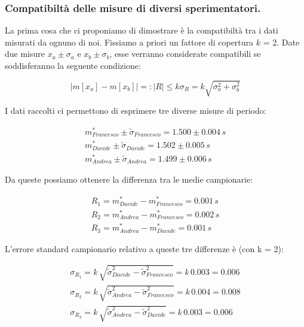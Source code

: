 \subsubsection{Compatibiltà delle misure di diversi sperimentatori.}

La prima cosa che ci proponiamo di dimostrare è la compatibiltà
tra i dati misurati da ognuno di noi. Fissiamo a priori un fattore
di copertura $k$ = 2. Date due misure $x_a \pm \sigma_a$ e $x_b \pm \sigma_b$,
esse verranno considerate compatibili se soddisferanno la seguente condizione:

\begin{equation*}
    |m[x_a] - m[x_b]| =: |R| \leq k\sigma_R = k\sqrt{\sigma_a^2 + \sigma_b^2}
\end{equation*}

I dati raccolti ci permettono di esprimere tre diverse misure di periodo:

\begin{equation*}
	\begin{split}
		m_{Francesco}^* \pm \tilde{\sigma}_{Francesco}  = 1.500 \pm 0.004\,s \\
		m_{Davide}^* \pm \tilde{\sigma}_{Davide} = 1.502 \pm 0.005\,s \\
		m_{Andrea}^* \pm \tilde{\sigma}_{Andrea} = 1.499 \pm 0.006\,s
	\end{split}
\end{equation*}

Da queste possiamo ottenere la differenza tra le medie campionarie:

\begin{equation*}
	\begin{split}
		R_{1} = m_{Davide}^* - m_{Francesco}^* = 0.001\,s \\
		R_{2} = m_{Andrea}^* - m_{Francesco}^* = 0.002\,s \\
		R_{3} = m_{Andrea}^* - m_{Davide}^* = 0.001\,s
	\end{split}
\end{equation*}

L'errore standard campionario relativo a queste tre differenze è (con k = 2):

\begin{equation*}
	\begin{split}
		\sigma_{R_{1}} = k\,\sqrt{\tilde{\sigma}^2_{Davide} - \tilde{\sigma}^2_{Francesco}} = k\,0.003 = 0.006\\
		\sigma_{R_{2}} = k\,\sqrt{\tilde{\sigma}^2_{Andrea} - \tilde{\sigma}^2_{Francesco}} = k\,0.004 = 0.008\\
		\sigma_{R_{3}} = k\,\sqrt{\tilde{\sigma}^2_{Andrea} - \tilde{\sigma}^2_{Davide}} = k\,0.003 = 0.006
	\end{split}
\end{equation*}

